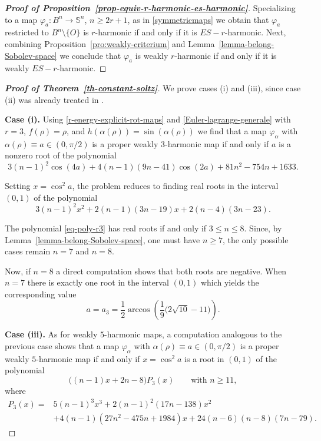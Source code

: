 \documentclass[11pt]{amsart}
\theoremstyle{plain}
\theoremstyle{definition}
\numberwithin{equation}{section}
\def \s{{\mathbb S}}
\numberwithin{equation}{section}
\begin{document}
\begin{proof}[{\bf Proof of Proposition~\ref{prop-equiv-r-harmonic-es-harmonic}}]
Specializing to a map $\varphi_a:B^n \to \s^n$, $n\geq 2r+1$, as in \eqref{symmetricmaps} we obtain that $\varphi_a$ restricted to $B^n\setminus\{O\}$ is $r$-harmonic if and only if it is $ES-r$-harmonic. Next,  combining Proposition~\ref{pro:weakly-criterium} and Lemma~\ref{lemma-belong-Sobolev-space} we conclude that $\varphi_a$ is weakly $r$-harmonic if and only if it is weakly $ES-r$-harmonic.
\end{proof}

\begin{proof}[\textbf{Proof of Theorem~\ref{th-constant-soltz}}]
We prove cases (i) and (iii), since case (ii) was already treated in \cite{BMOR1}.

\smallskip

\noindent
\textbf{Case (i).}
Using \eqref{r-energy-explicit-rot-maps} and \eqref{Euler-lagrange-generale} with $r=3$, $f(\rho)=\rho$, and $h(\alpha(\rho))=\sin(\alpha(\rho))$ we find that a map $\varphi_\alpha$ with $\alpha(\rho)\equiv a\in (0,\pi/2)$ is a proper weakly $3$-harmonic map if and only if $a$ is a nonzero root of the polynomial
\[
3(n-1)^2\cos(4a)
+4(n-1)(9n-41)\cos(2a)
+81n^2-754n+1633.
\]

Setting $x=\cos^2 a$, the problem reduces to finding real roots in the interval $(0,1)$ of the polynomial
\begin{equation}\label{eq-poly-r3}
3(n-1)^2 x^2 + 2(n-1)(3n-19)x + 2(n-4)(3n-23).
\end{equation}

The polynomial \eqref{eq-poly-r3} has real roots if and only if $3\le n\le 8$. Since, by Lemma~\ref{lemma-belong-Sobolev-space}, one must have $n\ge 7$, the only possible cases remain $n=7$ and $n=8$.

Now, if $n=8$ a direct computation shows that both roots are negative. When $n=7$ there is exactly one root in the interval $(0,1)$ which yields the corresponding value
\[
a=a_3=\frac{1}{2}\arccos\!\left(\frac{1}{9}\bigl(2\sqrt{10}-11\bigr)\right).
\]

\smallskip

\noindent
\textbf{Case (iii).}
As for weakly $5$-harmonic maps, a computation analogous to the previous case shows that a map $\varphi_\alpha$ with $\alpha(\rho)\equiv a \in (0,\pi /2)$ is a proper weakly $5$-harmonic map if and only if $x=\cos^2 a$ is a root in $(0,1)$ of the polynomial
\begin{equation}\label{eq-poly-r5}
\big((n-1)x+2n-8\big)P_3(x)
\qquad \text{with } n\ge 11,
\end{equation}
where
\[
\begin{aligned}
P_3(x)={}&5(n-1)^3 x^3
+2(n-1)^2(17n-138)x^2 \\
&+4(n-1)(27n^2-475n+1984)x
+24(n-6)(n-8)(7n-79).
\end{aligned}
\]


\end{proof}
\end{document}
